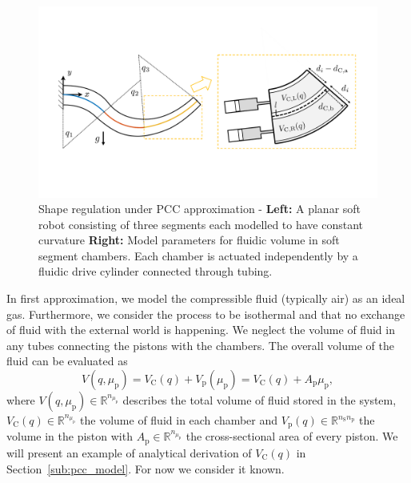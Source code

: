\begin{figure}[ht]
  \centering
  \includegraphics[width=0.9\columnwidth]{backstepping/figures/backstepping_graphics_pcc_case_overview_v4_cropped.pdf}
  \caption{Shape regulation under \gls{PCC} approximation - \textbf{Left:} A planar soft robot consisting of three segments each modelled to have constant curvature \textbf{Right:} Model parameters for fluidic volume in soft segment chambers. Each chamber is actuated independently by a fluidic drive cylinder connected through tubing.}\label{fig:pcc_case_overview}
\end{figure}


In first approximation, we model the compressible fluid (typically air) as an ideal gas. Furthermore, we consider the process to be isothermal and that no exchange of fluid with the external world is happening. We neglect the volume of fluid in any tubes connecting the pistons with the chambers.
%
The overall volume of the fluid can be evaluated as %
%
\begin{equation}
V(q,\mu_\mathrm{p}) = V_{\mathrm{C}}(q) + V_{\mathrm{p}}(\mu_{\mathrm{p}}) = V_{\mathrm{C}}(q) + A_{\mathrm{p}} \mu_{\mathrm{p}}, 
\end{equation}
%
where $V(q,\mu_\mathrm{p}) \in \mathbb{R}^{n_{\mu_\mathrm{p}}}$ describes the total volume of fluid stored in the system, $V_{\mathrm{C}}(q) \in \mathbb{R}^{n_{\mu_\mathrm{p}}}$ the volume of fluid in each chamber and $V_{\mathrm{p}}(q) \in \mathbb{R}^{n_{\mathrm{S}} n_{\mathrm{p}}}$ the volume in the piston with $A_{\mathrm{p}} \in \mathbb{R}^{n_{\mu_\mathrm{p}}}$ the cross-sectional area of every piston.
%
%
We will present an example of analytical derivation of $V_{\mathrm{C}}(q)$ in Section~\ref{sub:pcc_model}.
For now we consider it known.




